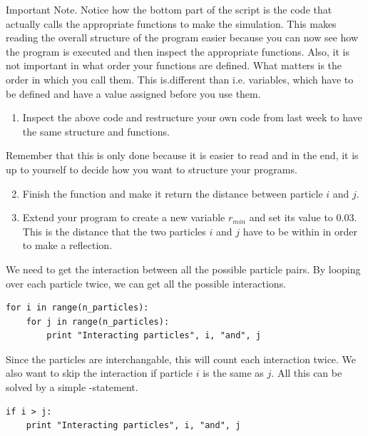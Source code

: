 \documentclass{article}
\begin{document}
\newpage
Important Note.
Notice how the bottom part of the script is the code that actually calls the
appropriate functions to make the simulation.  This makes reading the overall
structure of the program easier because you can now see how the program is
executed and then inspect the appropriate functions.  Also, it is not important
in what order your functions are defined. What matters is the order in which you
call them. This is.different than i.e. variables, which have to be defined and have a value assigned before you use them.

\begin{enumerate}
  \setcounter{enumi}{0}
  \item Inspect the above code and restructure your own code from last week to have the
    same structure and functions.
\end{enumerate}

Remember that this is only done because it is easier to read and in
the end, it is up to yourself to decide how you want to structure your
programs.

\begin{enumerate}
  \setcounter{enumi}{1}
  \item Finish the function  and make it return
    the distance  between particle $i$ and $j$.

  \item Extend your program to create a new variable $r_{min}$ and set its
    value to 0.03.
    This is the distance that the two particles $i$ and $j$ have to be within
    in order to make a reflection.


\end{enumerate}

We need to get the interaction between all the possible particle pairs.
By looping over each particle twice, we can get all the possible interactions.

\begin{lstlisting}
for i in range(n_particles):
    for j in range(n_particles):
        print "Interacting particles", i, "and", j
\end{lstlisting}

Since the particles are interchangable, this will count each interaction twice.
We also want to skip the interaction if particle $i$ is the same as $j$.
All this can be solved by a simple -statement.

\begin{lstlisting}
if i > j:
    print "Interacting particles", i, "and", j

\end{lstlisting}
\end{document}

